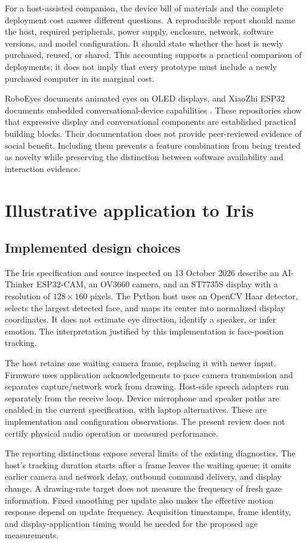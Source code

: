 \documentclass[journal]{IEEEtran}
\begin{document}
For a host-assisted companion, the device bill of materials and the complete deployment cost answer different questions. A reproducible report should name the host, required peripherals, power supply, enclosure, network, software versions, and model configuration. It should state whether the host is newly purchased, reused, or shared. This accounting supports a practical comparison of deployments; it does not imply that every prototype must include a newly purchased computer in its marginal cost.

RoboEyes documents animated eyes on OLED displays, and XiaoZhi ESP32 documents embedded conversational-device capabilities \cite{roboeyes,xiaozhi}. These repositories show that expressive display and conversational components are established practical building blocks. Their documentation does not provide peer-reviewed evidence of social benefit. Including them prevents a feature combination from being treated as novelty while preserving the distinction between software availability and interaction evidence.

\section{Illustrative application to Iris}
\subsection{Implemented design choices}
The Iris specification and source inspected on 13 October 2026 describe an AI-Thinker ESP32-CAM, an OV3660 camera, and an ST7735S display with a resolution of $128\times160$ pixels. The Python host uses an OpenCV Haar detector, selects the largest detected face, and maps its center into normalized display coordinates. It does not estimate eye direction, identify a speaker, or infer emotion. The interpretation justified by this implementation is face-position tracking.

The host retains one waiting camera frame, replacing it with newer input. Firmware uses application acknowledgements to pace camera transmission and separates capture/network work from drawing. Host-side speech adapters run separately from the receive loop. Device microphone and speaker paths are enabled in the current specification, with laptop alternatives. These are implementation and configuration observations. The present review does not certify physical audio operation or measured performance.

The reporting distinctions expose several limits of the existing diagnostics. The host's tracking duration starts after a frame leaves the waiting queue; it omits earlier camera and network delay, outbound command delivery, and display change. A drawing-rate target does not measure the frequency of fresh gaze information. Fixed smoothing per update also makes the effective motion response depend on update frequency. Acquisition timestamps, frame identity, and display-application timing would be needed for the proposed age measurements.
\end{document}
